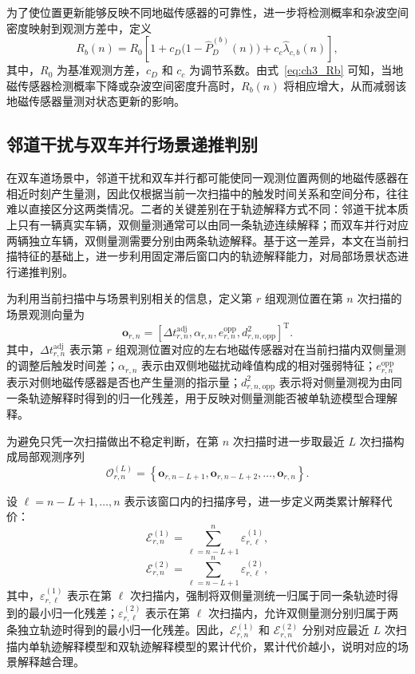 \documentclass{xdupgthesis}
\begin{document}
为了使位置更新能够反映不同地磁传感器的可靠性，进一步将检测概率和杂波空间密度映射到观测方差中，定义
\begin{equation}
	R_b(n)
	=
	R_0\left[1+c_D\bigl(1-\hat P_D^{(b)}(n)\bigr)+c_c\hat\lambda_{c,b}(n)\right],
	\label{eq:ch3_Rb}
\end{equation}
其中，$R_0$ 为基准观测方差，$c_D$ 和 $c_c$ 为调节系数。由式~\eqref{eq:ch3_Rb} 可知，当地磁传感器检测概率下降或杂波空间密度升高时，$R_b(n)$ 将相应增大，从而减弱该地磁传感器量测对状态更新的影响。

\subsection{邻道干扰与双车并行场景递推判别}

在双车道场景中，邻道干扰和双车并行都可能使同一观测位置两侧的地磁传感器在相近时刻产生量测，因此仅根据当前一次扫描中的触发时间关系和空间分布，往往难以直接区分这两类情况。二者的关键差别在于轨迹解释方式不同：邻道干扰本质上只有一辆真实车辆，双侧量测通常可以由同一条轨迹连续解释；而双车并行对应两辆独立车辆，双侧量测需要分别由两条轨迹解释。基于这一差异，本文在当前扫描特征的基础上，进一步利用固定滞后窗口内的轨迹解释能力，对局部场景状态进行递推判别。

为利用当前扫描中与场景判别相关的信息，定义第 $r$ 组观测位置在第 $n$ 次扫描的场景观测向量为
\begin{equation}
	\mathbf o_{r,n}
	=
	\left[
	\Delta t_{r,n}^{\mathrm{adj}},
	\alpha_{r,n},
	e_{r,n}^{\mathrm{opp}},
	d_{r,n,\mathrm{opp}}^2
	\right]^{\mathrm T}.
\end{equation}
其中，$\Delta t_{r,n}^{\mathrm{adj}}$ 表示第 $r$ 组观测位置对应的左右地磁传感器对在当前扫描内双侧量测的调整后触发时间差；$\alpha_{r,n}$ 表示由双侧地磁扰动峰值构成的相对强弱特征；$e_{r,n}^{\mathrm{opp}}$ 表示对侧地磁传感器是否也产生量测的指示量；$d_{r,n,\mathrm{opp}}^2$ 表示将对侧量测视为由同一条轨迹解释时得到的归一化残差，用于反映对侧量测能否被单轨迹模型合理解释。

为避免只凭一次扫描做出不稳定判断，在第 $n$ 次扫描时进一步取最近 $L$ 次扫描构成局部观测序列
\begin{equation}
	\mathcal O_{r,n}^{(L)}
	=
	\left\{
	\mathbf o_{r,n-L+1},
	\mathbf o_{r,n-L+2},
	\ldots,
	\mathbf o_{r,n}
	\right\}.
\end{equation}

设 $\ell=n-L+1,\ldots,n$ 表示该窗口内的扫描序号，进一步定义两类累计解释代价：
\begin{equation}
	\mathcal E_{r,n}^{(1)}
	=
	\sum_{\ell=n-L+1}^{n}\varepsilon_{r,\ell}^{(1)},
\end{equation}
\begin{equation}
	\mathcal E_{r,n}^{(2)}
	=
	\sum_{\ell=n-L+1}^{n}\varepsilon_{r,\ell}^{(2)},
\end{equation}
其中，$\varepsilon_{r,\ell}^{(1)}$ 表示在第 $\ell$ 次扫描内，强制将双侧量测统一归属于同一条轨迹时得到的最小归一化残差；$\varepsilon_{r,\ell}^{(2)}$ 表示在第 $\ell$ 次扫描内，允许双侧量测分别归属于两条独立轨迹时得到的最小归一化残差。因此，$\mathcal E_{r,n}^{(1)}$ 和 $\mathcal E_{r,n}^{(2)}$ 分别对应最近 $L$ 次扫描内单轨迹解释模型和双轨迹解释模型的累计代价，累计代价越小，说明对应的场景解释越合理。
\end{document}

